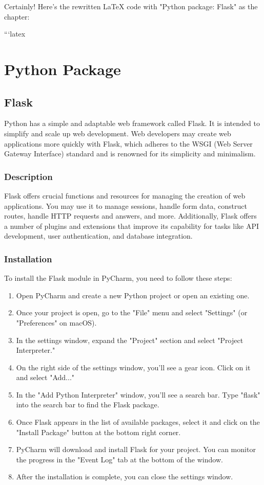 %
%
%

Certainly! Here's the rewritten LaTeX code with "Python package: Flask" as the chapter:

```latex
\chapter{Python Package}

\section{Flask}

Python has a simple and adaptable web framework called Flask. It is intended to simplify and scale up web development. Web developers may create web applications more quickly with Flask, which adheres to the WSGI (Web Server Gateway Interface) standard and is renowned for its simplicity and minimalism. \cite{flaskdocs:2021}

\subsection{Description}

Flask offers crucial functions and resources for managing the creation of web applications. You may use it to manage sessions, handle form data, construct routes, handle HTTP requests and answers, and more. Additionally, Flask offers a number of plugins and extensions that improve its capability for tasks like API development, user authentication, and database integration. 

\subsection{Installation}
To install the Flask module in PyCharm, you need to follow these steps:

\begin{enumerate}
	\item Open PyCharm and create a new Python project or open an existing one.
	\item Once your project is open, go to the "File" menu and select "Settings" (or "Preferences" on macOS).
	\item In the settings window, expand the "Project" section and select "Project Interpreter."
	\item On the right side of the settings window, you'll see a gear icon. Click on it and select "Add..."
	\item In the "Add Python Interpreter" window, you'll see a search bar. Type "flask" into the search bar to find the Flask package.
	\item Once Flask appears in the list of available packages, select it and click on the "Install Package" button at the bottom right corner.
	\item PyCharm will download and install Flask for your project. You can monitor the progress in the "Event Log" tab at the bottom of the window.
	\item After the installation is complete, you can close the settings window.
\end{enumerate}

